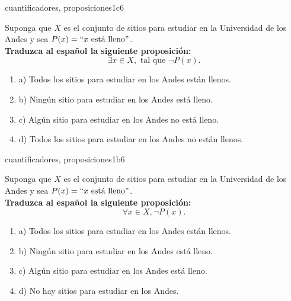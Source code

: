 \documentclass{article}
\begin{document}
\begin{question}{27}{cuantificadores, proposiciones}{1}{c}{6}{
Suponga que $X$ es el conjunto de sitios para estudiar en la Universidad de los Andes y sea $P(x)=``x\text{ está lleno}"$.\\

\textbf{Traduzca al español la siguiente proposición:}
\[
\exists x \in X, \text{ tal que } \neg P(x).
\]

\begin{enumerate}
   \item a) Todos los sitios para estudiar en los Andes están llenos.  
   \item b) Ningún sitio para estudiar en los Andes está lleno.  
   \item c) Algún sitio para estudiar en los Andes no está lleno.  
   \item d) Todos los sitios para estudiar en los Andes no están llenos.  
\end{enumerate}
}
\end{question}

\begin{question}{28}{cuantificadores, proposiciones}{1}{b}{6}{
Suponga que $X$ es el conjunto de sitios para estudiar en la Universidad de los Andes y sea $P(x)=``x\text{ está lleno}"$.\\

\textbf{Traduzca al español la siguiente proposición:}
\[
\forall x \in X, \neg P(x).
\]

\begin{enumerate}
   \item a) Todos los sitios para estudiar en los Andes están llenos.  
   \item b) Ningún sitio para estudiar en los Andes está lleno.  
   \item c) Algún sitio para estudiar en los Andes está lleno.  
   \item d) No hay sitios para estudiar en los Andes.  
\end{enumerate}
}
\end{question}
\end{document}
